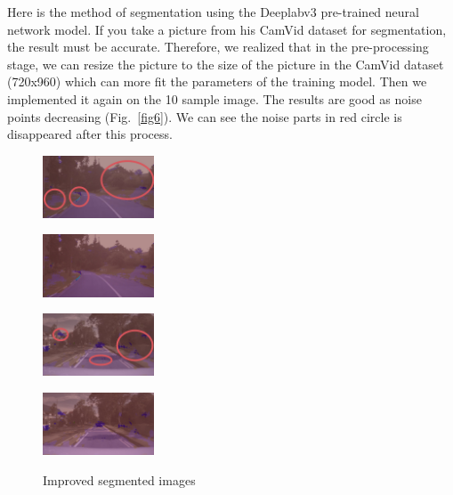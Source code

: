 \documentclass[8pt]{article}
\theoremstyle{nonumberplain}
\begin{document}
Here is the method of segmentation using the Deeplabv3 pre-trained neural network model. If you take a picture from his CamVid dataset for segmentation, the result must be accurate. Therefore, we realized that in the pre-processing stage, we can resize the picture to the size of the picture in the CamVid dataset (720x960) which can more fit the parameters of the training model. Then we implemented it again on the 10 sample image. The results are good as noise points decreasing (Fig.~\ref{fig6}). We can see the noise parts in red circle is disappeared after this process.

\begin{figure}[H]
	\centering
	\begin{minipage}[t]{0.24\textwidth}
		\centering
		\includegraphics[width=3.3cm]{fig7a.jpg}
		\label{fig7a}
	\end{minipage}
	\begin{minipage}[t]{0.24\textwidth}
		\centering
		\includegraphics[width=3.3cm]{fig7b.jpg}
		\label{fig7b}
	\end{minipage}
	\begin{minipage}[t]{0.24\textwidth}
		\centering
		\includegraphics[width=3.3cm]{fig7c.jpg}
		\label{fig7c}
	\end{minipage}
	\begin{minipage}[t]{0.24\textwidth}
		\centering
		\includegraphics[width=3.3cm]{fig7d.jpg}
		\label{fig7d}
	\end{minipage}
	\caption{Improved segmented images}
	\label{fig7}
\end{figure}

















	
\end{document}
